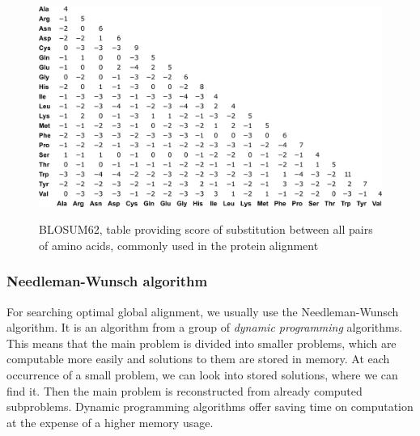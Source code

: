\begin{figure}[ht]
  \centering
	\includegraphics[width=\textwidth]{./images/blosum62.png}
	\cite{blosum}
  \caption[BLOSUM62]{BLOSUM62, table providing score of substitution between all pairs of amino acids, commonly used in the protein alignment}
  \label{fig:blosum}
\end{figure}


\subsubsection{Needleman-Wunsch algorithm}
For searching optimal global alignment, we usually use the Needleman-Wunsch algorithm.
It is an algorithm from a group of \emph{dynamic programming} algorithms.
This means that the main problem is divided into smaller problems, which are computable more easily and solutions to them are stored in memory.
At each occurrence of a small problem, we can look into stored solutions, where we can find it.
Then the main problem is reconstructed from already computed subproblems.
Dynamic programming algorithms offer saving time on computation at the expense of a higher memory usage.

